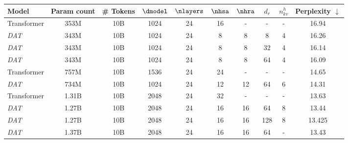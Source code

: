\begin{tabular}{@{}lcc|cccccc|c@{}}
    \toprule
    Model        & Param count   & \# Tokens &$\dmodel$&$\nlayers$& $\nhsa$  & $\nhra$ & $d_r$ & $n_{kv}^{h}$ & Perplexity $\downarrow$ \\ \midrule\hline
    Transformer  & 353M   & 10B       & 1024    & 24       & 16       & -        & -     & -           & 16.94     \\
    \textit{DAT} & 343M   & 10B       & 1024    & 24       & 8        & 8        & 8     & 4           & 16.26     \\
    \textit{DAT} & 343M   & 10B       & 1024    & 24       & 8        & 8        & 32    & 4           & 16.14     \\
    \textit{DAT} & 343M   & 10B       & 1024    & 24       & 8        & 8        & 64    & 4           & 16.09     \\\midrule
    Transformer  & 757M   & 10B       & 1536    & 24       & 24       & -        & -     & -           & 14.65     \\
    \textit{DAT} & 734M   & 10B       & 1024    & 24       & 12       & 12       & 64     & 6          & 14.31     \\\midrule
    Transformer  & 1.31B  & 10B       & 2048    & 24       & 32       & -        & -     & -           & 13.63     \\
    \textit{DAT} & 1.27B  & 10B       & 2048    & 24       & 16       & 16       & 64    & 8           & 13.44     \\
    \textit{DAT} & 1.27B  & 10B       & 2048    & 24       & 16       & 16       & 128   & 8           & 13.425     \\
    \textit{DAT} & 1.37B  & 10B       & 2048    & 24       & 16       & 16       & 64    & -           & 13.43     \\ \bottomrule
\end{tabular}%
